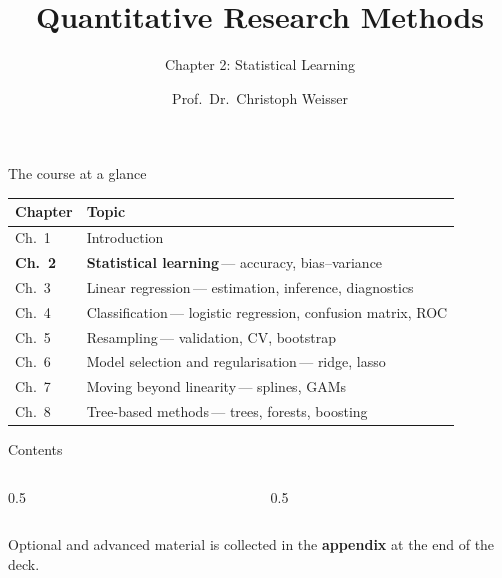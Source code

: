 \documentclass[aspectratio=169,11pt]{beamer}
\title{Quantitative Research Methods}
\subtitle{Chapter 2: Statistical Learning}
\author{Prof.\ Dr.\ Christoph Weisser}
\date{}\graphicspath{{images/}}
\begin{document}
\begin{frame}[plain]\titlepage\end{frame}

\begin{frame}{The course at a glance}
  \vspace{-1.5mm}
  \begin{center}
  \scriptsize
  \setlength{\tabcolsep}{5pt}
  \renewcommand{\arraystretch}{1.30}
  \begin{tabular}{@{\hspace{2pt}}l >{\raggedright\arraybackslash}p{}@{\hspace{2pt}}}
    \toprule
    \textbf{Chapter} & \textbf{Topic} \\
    \midrule
     {\color{accent}Ch.\ 1} & Introduction \\
    \rowcolor{accent!18} \textbf{Ch.\ 2} & \textbf{Statistical learning}\,{\color{accent!75!black}--- accuracy, bias--variance} \\
     {\color{accent}Ch.\ 3} & Linear regression\,{\color{black!45}--- estimation, inference, diagnostics} \\
    \rowcolor{black!3} {\color{accent}Ch.\ 4} & Classification\,{\color{black!45}--- logistic regression, confusion matrix, ROC} \\
     {\color{accent}Ch.\ 5} & Resampling\,{\color{black!45}--- validation, CV, bootstrap} \\
    \rowcolor{black!3} {\color{accent}Ch.\ 6} & Model selection and regularisation\,{\color{black!45}--- ridge, lasso} \\
     {\color{accent}Ch.\ 7} & Moving beyond linearity\,{\color{black!45}--- splines, GAMs} \\
    \rowcolor{black!3} {\color{accent}Ch.\ 8} & Tree-based methods\,{\color{black!45}--- trees, forests, boosting} \\
    \bottomrule
  \end{tabular}
  \end{center}
\end{frame}


\begin{frame}{Contents}
  \begin{columns}[t]
    \begin{column}{0.5\textwidth}
      \tableofcontents[hideallsubsections,sections={1-6}]
    \end{column}
    \begin{column}{0.5\textwidth}
      \tableofcontents[hideallsubsections,sections={7-11}]
    \end{column}
  \end{columns}
  \vfill
  {\tiny Optional and advanced material is collected in the \textbf{appendix} at the end of the deck.}
\end{frame}
\end{document}
